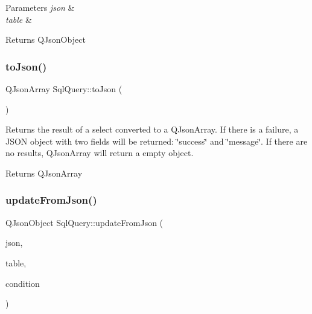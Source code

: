 \begin{DoxyParams}{Parameters}
{\em json} & \\
\hline
{\em table} & \\
\hline
\end{DoxyParams}
\begin{DoxyReturn}{Returns}
Q\+Json\+Object 
\end{DoxyReturn}
\mbox{\label{class_sql_query_a4f12c62fa99bb2f5738b54e5cbefa0f9}} 
\subsubsection{\texorpdfstring{to\+Json()}{toJson()}}
{\footnotesize\ttfamily Q\+Json\+Array Sql\+Query\+::to\+Json (\begin{DoxyParamCaption}{ }\end{DoxyParamCaption})}



Returns the result of a select converted to a Q\+Json\+Array. If there is a failure, a J\+S\+ON object with two fields will be returned\+: \char`\"{}success\char`\"{} and \char`\"{}message\char`\"{}. If there are no results, Q\+Json\+Array will return a empty object. 

\begin{DoxyReturn}{Returns}
Q\+Json\+Array 
\end{DoxyReturn}
\mbox{\label{class_sql_query_a57821078a46629590e01e3645af13edf}} 
\subsubsection{\texorpdfstring{update\+From\+Json()}{updateFromJson()}}
{\footnotesize\ttfamily Q\+Json\+Object Sql\+Query\+::update\+From\+Json (\begin{DoxyParamCaption}\item[{const Q\+Json\+Object \&}]{json,  }\item[{const Q\+String \&}]{table,  }\item[{const Q\+String \&}]{condition }\end{DoxyParamCaption})}



